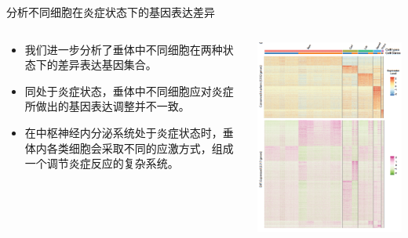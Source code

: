 \documentclass{beamer}
\begin{document}
\begin{frame}{分析不同细胞在炎症状态下的基因表达差异}
  \begin{columns}
    \begin{column}{.5\linewidth}
      \begin{itemize}
        \item 我们进一步分析了垂体中不同细胞在两种状态下的差异表达基因集合。
        \item 同处于炎症状态，垂体中不同细胞应对炎症所做出的基因表达调整并不一致。
        \item 在中枢神经内分泌系统处于炎症状态时，垂体内各类细胞会采取不同的应激方式，组成一个调节炎症反应的复杂系统。
      \end{itemize}
    \end{column}

    \begin{column}{.5\linewidth}
      \includegraphics[width=\linewidth]{figs/expr-res4.png}
    \end{column}
  \end{columns}
\end{frame}
\end{document}
